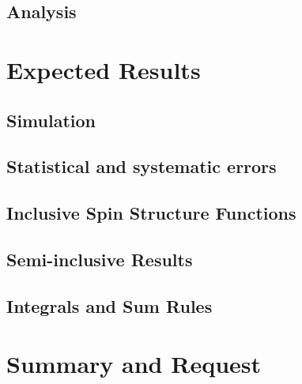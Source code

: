 \documentclass[12pt]{article}
\begin{document}
\subsection{Analysis}

\section{Expected Results}
\subsection{Simulation} 

\subsection{Statistical and systematic errors}

\subsection{Inclusive Spin Structure Functions}

\subsection{Semi-inclusive Results} 

\subsection{Integrals and Sum Rules} 

\section{Summary and Request}

\end{document}
